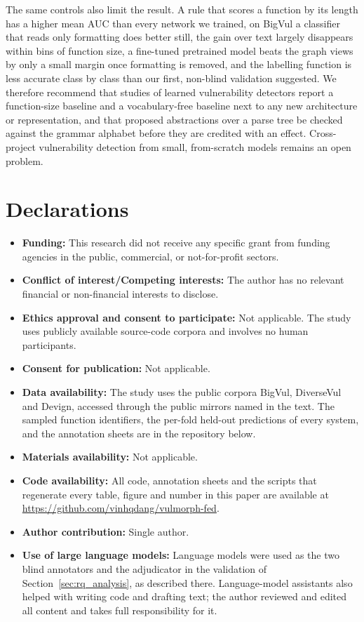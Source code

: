 \documentclass[pdflatex,sn-basic]{sn-jnl}
\theoremstyle{thmstyleone}%
\begin{document}
The same controls also limit the result. A rule that scores a function by its
length has a higher mean AUC than every network we trained, on BigVul a
classifier that reads only formatting does better still, the gain over text largely
disappears within bins of function size, a fine-tuned pretrained model beats the graph views by only a small margin
once formatting is removed, and the labelling function is less accurate class by class than
our first, non-blind validation suggested. We therefore recommend that studies
of learned vulnerability detectors report a function-size baseline and a
vocabulary-free baseline next to any new architecture or representation, and
that proposed abstractions over a parse tree be checked against the grammar
alphabet before they are credited with an effect. Cross-project vulnerability
detection from small, from-scratch models remains an open problem.


\section*{Declarations}

\begin{itemize}
\item \textbf{Funding:} This research did not receive any specific grant from funding agencies in the public, commercial, or not-for-profit sectors.
\item \textbf{Conflict of interest/Competing interests:} The author has no relevant financial or non-financial interests to disclose.
\item \textbf{Ethics approval and consent to participate:} Not applicable. The study uses publicly available source-code corpora and involves no human participants.
\item \textbf{Consent for publication:} Not applicable.
\item \textbf{Data availability:} The study uses the public corpora BigVul, DiverseVul and Devign, accessed through the public mirrors named in the text. The sampled function identifiers, the per-fold held-out predictions of every system, and the annotation sheets are in the repository below.
\item \textbf{Materials availability:} Not applicable.
\item \textbf{Code availability:} All code, annotation sheets and the scripts that regenerate every table, figure and number in this paper are available at \url{https://github.com/vinhqdang/vulmorph-fed}.
\item \textbf{Author contribution:} Single author.
\item \textbf{Use of large language models:} Language models were used as the two blind annotators and the adjudicator in the validation of Section~\ref{sec:rq_analysis}, as described there. Language-model assistants also helped with writing code and drafting text; the author reviewed and edited all content and takes full responsibility for it.
\end{itemize}


\end{document}
